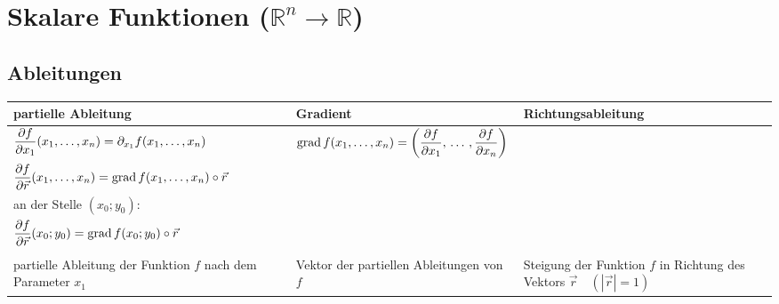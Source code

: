 \section{Skalare Funktionen ($\mathbb{R}^n \rightarrow \mathbb{R}$)
}

\subsection{Ableitungen}
\begin{tabular}{|l|l|l|}
\hline
\textbf{partielle Ableitung} & \textbf{Gradient} & \textbf{Richtungsableitung}\\
\hline
\begin{minipage}{5.5cm}
	\vspace{0.2cm}
	$\dfrac{\partial f}{\partial x_1}(x_1,\ldots,x_n)= \partial_{x_1} f(x_1,\ldots,x_n)$
	\vspace{0.2cm}
\end{minipage}&
\begin{minipage}{6cm}
	$\operatorname{grad} f(x_1,\ldots,x_n)= \left(\dfrac{\partial f}{\partial x_1}, \,\ldots\,,
	\dfrac{\partial f}{\partial x_n}\right)$ \end{minipage}&
\begin{minipage}{6.5cm}
	\vspace{0.1cm}
	 Allgemein:\\\vspace{0.1cm}
  $\dfrac{\partial f}{\partial \vec{r}}(x_1, \ldots, x_n)=\operatorname{grad} f(x_1, \ldots, x_n)
  \circ \vec{r}$\\
  \vspace{0.3cm}
	an der Stelle $(x_0;y_0)$:\\\vspace{0.1cm}
	$\dfrac{\partial f}{\partial \vec{r}}(x_0;y_0)=\operatorname{grad} f(x_0;y_0) \circ \vec{r}$\\

	
	\vspace{0.1cm}
\end{minipage}\\
\hline
\begin{minipage}{5.5cm}
	\vspace{0.2cm}
	partielle Ableitung der Funktion $f$ nach dem Parameter $x_1$
	\vspace{0.2cm}
\end{minipage}&
\begin{minipage}{5.5cm}
	Vektor der partiellen Ableitungen von $f$
\end{minipage}&
\begin{minipage}{5.5cm}
	Steigung der Funktion $f$ in Richtung des Vektors $\vec{r}\quad (|\vec{r}|=1)$
\end{minipage}\\
\hline
\end{tabular}

